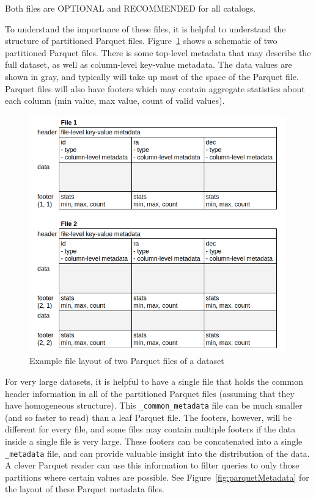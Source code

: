 \documentclass[11pt,a4paper]{ivoa}
\begin{document}
Both files are OPTIONAL and RECOMMENDED for all catalogs.

To understand the importance of these files, it is helpful to understand the structure of partitioned Parquet files. 
Figure~\ref{fig:partitionedParquet} shows a schematic of two partitioned Parquet files. 
There is some top-level metadata that may describe the full dataset, as well as column-level key-value metadata.
The data values are shown in gray, and typically will take up most of the space of the Parquet file. 
Parquet files will also have footers which may contain aggregate statistics about each column (min value, max value, count of valid values).

\begin{figure}
\centering
\includegraphics[width=0.99\textwidth]{leaf_files.png}
\caption{Example file layout of two Parquet files of a dataset}
\label{fig:partitionedParquet}
\end{figure}

For very large datasets, it is helpful to have a single file that holds the common header information in all of the partitioned Parquet files (assuming that they have homogeneous structure).
This \texttt{\_common\_metadata} file can be much smaller (and so faster to read) than a leaf Parquet file.
The footers, however, will be different for every file, and some files may contain multiple footers if the data inside a single file is very large.
These footers can be concatenated into a single \texttt{\_metadata} file, and can provide valuable insight into the distribution of the data. 
A clever Parquet reader can use this information to filter queries to only those partitions where certain values are possible.
See Figure~\ref{fig:parquetMetadata} for the layout of these Parquet metadata files.
\end{document}
